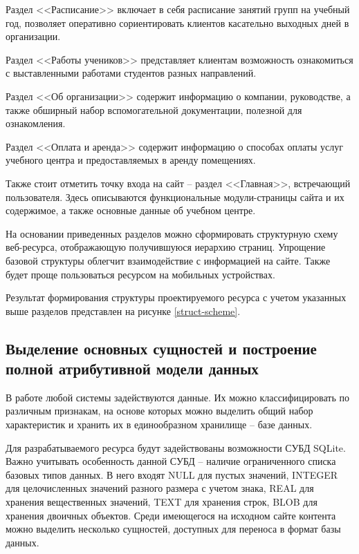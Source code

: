 Раздел <<Расписание>> включает в себя расписание занятий групп на учебный год, позволяет оперативно сориентировать клиентов касательно выходных дней в организации.

Раздел <<Работы учеников>> представляет клиентам возможность ознакомиться с выставленными работами студентов разных направлений.

Раздел <<Об организации>> содержит информацию о компании, руководстве, а также обширный набор вспомогательной документации, полезной для ознакомления.

Раздел <<Оплата и аренда>> содержит информацию о способах оплаты услуг учебного центра и предоставляемых в аренду помещениях.

Также стоит отметить точку входа на сайт -- раздел <<Главная>>, встречающий пользователя.
Здесь описываются функциональные модули-страницы сайта и их содержимое, а также основные данные об учебном центре.

На основании приведенных разделов можно сформировать структурную схему веб-ресурса, отображающую получившуюся иерархию страниц.
Упрощение базовой структуры облегчит взаимодействие с информацией на сайте.
Также будет проще пользоваться ресурсом на мобильных устройствах.

Результат формирования структуры проектируемого ресурса с учетом указанных выше разделов представлен на рисунке \ref{struct-scheme}.



\subsection{Выделение основных сущностей и построение полной атрибутивной модели данных}\label{Выделение основных сущностей и построение полной атрибутивной модели данных}

В работе любой системы задействуются данные.
Их можно классифицировать по различным признакам, на основе которых можно выделить общий набор характеристик и хранить их в единообразном хранилище -- базе данных.

Для разрабатываемого ресурса будут задействованы возможности СУБД SQLite.
Важно учитывать особенность данной СУБД -- наличие ограниченного списка базовых типов данных.
В него входят NULL для пустых значений, INTEGER для целочисленных значений разного размера с учетом знака, REAL для хранения вещественных значений, TEXT для хранения строк, BLOB для хранения двоичных объектов.
Среди имеющегося на исходном сайте контента можно выделить несколько сущностей, доступных для переноса в формат базы данных.

